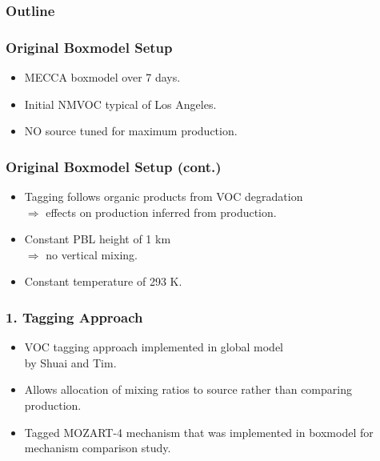 \begin{frame}
    \frametitle{Outline} 
    \tableofcontents[currentsection]
\end{frame} 

\begin{frame}
    \frametitle{Original Boxmodel Setup}

    \vspace{-0.5cm}
    \begin{itemize}
        \item MECCA boxmodel over 7 days. \vspace{6mm}
        \item Initial NMVOC typical of Los Angeles. \vspace{6mm}
        \item NO source tuned for maximum  production. 
    \end{itemize}
\end{frame}

\begin{frame}
    \frametitle{Original Boxmodel Setup (cont.)}

    \vspace{-5mm}
    \begin{itemize}
        \item Tagging follows organic products from VOC degradation \\ \hspace{2mm}$\Rightarrow$ effects on  production inferred from  production. \vspace{4mm}
        \item Constant PBL height of 1 km \\ \hspace{2mm}$\Rightarrow$ no vertical mixing. \vspace{4mm}
        \item Constant temperature of 293 K.
    \end{itemize}
\end{frame}

\begin{frame}
    \frametitle{1. Tagging Approach}

    \vspace{-5mm}
    \begin{itemize}
        \item VOC tagging approach implemented in global model \\ by Shuai and Tim. \vspace{3mm}
        \item Allows allocation of  mixing ratios to source rather than comparing  production. \vspace{3mm}
        \item Tagged MOZART-4 mechanism that was implemented in boxmodel for mechanism comparison study.
    \end{itemize}
\end{frame}

